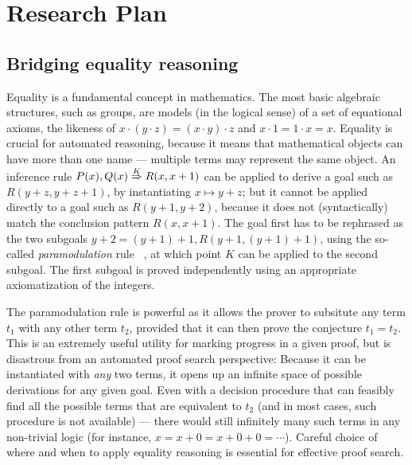 \section{Research Plan }


\subsection{Bridging equality reasoning}

Equality is a fundamental concept in mathematics.
The most basic algebraic structures, such as groups,
are models (in the logical sense) of a set of equational
axioms, the likeness of $x\cdot(y\cdot z) = (x\cdot y)\cdot z$ and $x\cdot 1 = 1\cdot x = x$.
Equality is crucial for automated reasoning, because it means that mathematical objects can have more than one name --- multiple terms may represent the same object.
An inference rule $\infruleshort{K}{P(x),Q(x)}{R(x, x+1)}$
can be applied to derive a goal such as $R(y+z, y+z+1)$,
by instantiating $x\mapsto y+z$;
but it cannot be applied directly to a goal such as
$R(y+1, y+2)$, because it does not (syntactically) match the conclusion pattern $R(x,x+1)$.
The goal first has to be rephrased as the two subgoals
$y + 2 = (y + 1) + 1, R(y+1, (y+1)+1)$, using the so-called \emph{paramodulation} rule%
~\cite{Book2001:Nieuwenhuis},
at which point $K$ can be applied to the second subgoal.
The first subgoal is proved independently using an appropriate axiomatization of the integers.

The paramodulation rule is powerful as it allows the prover to subsitute any term $t_1$ with any other term $t_2$, provided that it can then prove the conjecture $t_1 = t_2$.
This is an extremely useful utility for marking progress in a given proof, but is disastrous from an automated proof search perspective:
Because it can be instantiated with \emph{any} two terms, it opens up an infinite space of possible derivations for any given goal.
Even with a decision procedure that can feasibly find all the possible terms that are equivalent to $t_2$ (and in most cases, such procedure is not available) ---
there would still infinitely many such terms in any non-trivial logic (for instance, $x = x + 0 = x + 0 + 0 = \cdots$).
Careful choice of where and when to apply equality reasoning is essential for effective proof search.

